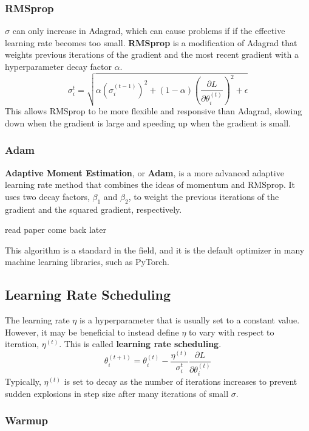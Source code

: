 \documentclass[12pt]{report}
\theoremstyle{definition}
\theoremstyle{remark}
\begin{document}
\subsubsection{RMSprop}
$\sigma$ can only increase in Adagrad, which can cause problems if if the effective learning rate becomes too small. \textbf{RMSprop} is a modification of Adagrad that weights previous iterations of the gradient and the most recent gradient with a hyperparameter decay factor $\alpha$.
\begin{equation}
    \sigma_i^t = \sqrt{\alpha {(\sigma_i^{(t-1)})}^2 + (1-\alpha)\left(\frac{\partial L}{\partial \theta_i^{(t)}}\right)^2 + \epsilon}
\end{equation}
This allows RMSprop to be more flexible and responsive than Adagrad, slowing down when the gradient is large and speeding up when the gradient is small.
\subsubsection{Adam}
\textbf{Adaptive Moment Estimation}, or \textbf{Adam}, is a more advanced adaptive learning rate method that combines the ideas of momentum and RMSprop. It uses two decay factors, $\beta_1$ and $\beta_2$, to weight the previous iterations of the gradient and the squared gradient, respectively.

\cite{kingma_adam_2017}

read paper come back later

This algorithm is a standard in the field, and it is the default optimizer in many machine learning libraries, such as PyTorch.

\subsection{Learning Rate Scheduling}

The learning rate $\eta$ is a hyperparameter that is usually set to a constant value. However, it may be beneficial to instead define $\eta$ to vary with respect to iteration, $\eta^{(t)}$. This is called \textbf{learning rate scheduling}.
\begin{equation}
    \theta_{i}^{(t+1)} = \theta_{i}^{(t)} - \frac{\eta^{(t)}}{\sigma_i^t}\frac{\partial L}{\partial \theta_i^{(t)}}
\end{equation}
Typically, $\eta^{(t)}$ is set to decay as the number of iterations increases to prevent sudden explosions in step size after many iterations of small $\sigma$.

\subsubsection{Warmup}
\end{document}

